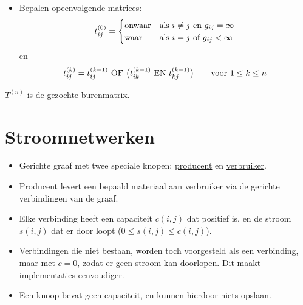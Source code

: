 \documentclass{report}
\begin{document}
\begin{itemize}
\begin{enumerate}
\begin{itemize}
					\item[\info] Bepalen opeenvolgende matrices:
					$$t_{ij}^{(0)} = 
					\begin{cases}
						\hbox{onwaar} & \hbox{als } i \neq j \hbox{ en } g_{ij} = \infty\\
						\hbox{waar}   & \hbox{als } i = j \hbox{ of } g_{ij} < \infty
					\end{cases}$$
					en
					$$
						t_{ij}^{(k)} = t_{ij}^{(k - 1)} \hbox{ OF } \big(t_{ik}^{(k - 1)} \hbox{ EN } t_{kj}^{(k - 1)}\big) \qquad \hbox{voor } 1 \leq k \leq n
					$$
				\end{itemize}
				$T^{(n)}$ is de gezochte burenmatrix.
	\end{enumerate}
\end{itemize}


\chapter{Stroomnetwerken}
\begin{itemize}
	\item [\info]  Gerichte graaf met twee speciale knopen: \underline{producent} en \underline{verbruiker}.
	\item [\info]  Producent levert een bepaald materiaal aan verbruiker via de gerichte verbindingen van de graaf.
	\item [\info]  Elke verbinding heeft een capaciteit $c(i, j)$ dat positief is, en de stroom $s(i, j)$ dat er door loopt ($0 \leq s(i, j) \leq c(i, j)$). 
	\item [\info]  Verbindingen die niet bestaan, worden toch voorgesteld als een verbinding, maar met $c = 0$, zodat er geen stroom kan doorlopen. Dit maakt implementaties eenvoudiger.
	\item [\info] Een knoop bevat geen capaciteit, en kunnen hierdoor niets opslaan.
\end{itemize}
\end{document}
